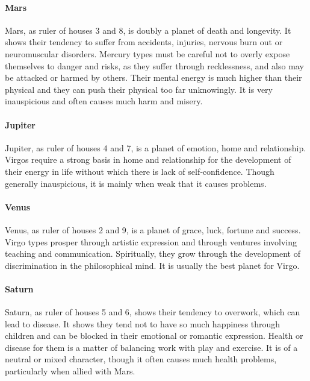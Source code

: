  

\paragraph{Mars}

Mars, as ruler of houses 3 and 8, is doubly a planet of death and longevity. It shows their tendency to suffer from accidents, injuries, nervous burn out or neuromuscular disorders. Mercury types must be careful not to overly expose themselves to danger and risks, as they suffer through recklessness, and also may be attacked or harmed by others. Their mental energy is much higher than their physical and they can push their physical too far unknowingly. It is very inauspicious and often causes much harm and misery.

 

\paragraph{Jupiter}

Jupiter, as ruler of houses 4 and 7, is a planet of emotion, home and relationship. Virgos require a strong basis in home and relationship for the development of their energy in life without which there is lack of self‑confidence. Though generally inauspicious, it is mainly when weak that it causes problems.

 

\paragraph{Venus}

Venus, as ruler of houses 2 and 9, is a planet of grace, luck, fortune and success. Virgo types prosper through artistic expression and through ventures involving teaching and communication. Spiritually, they grow through the development of discrimination in the philosophical mind. It is usually the best planet for Virgo.

 

\paragraph{Saturn}

Saturn, as ruler of houses 5 and 6, shows their tendency to overwork, which can lead to disease. It shows they tend not to have so much happiness through children and can be blocked in their emotional or romantic expression. Health or disease for them is a matter of balancing work with play and exercise. It is of a neutral or mixed character, though it often causes much health problems, particularly when allied with Mars.

